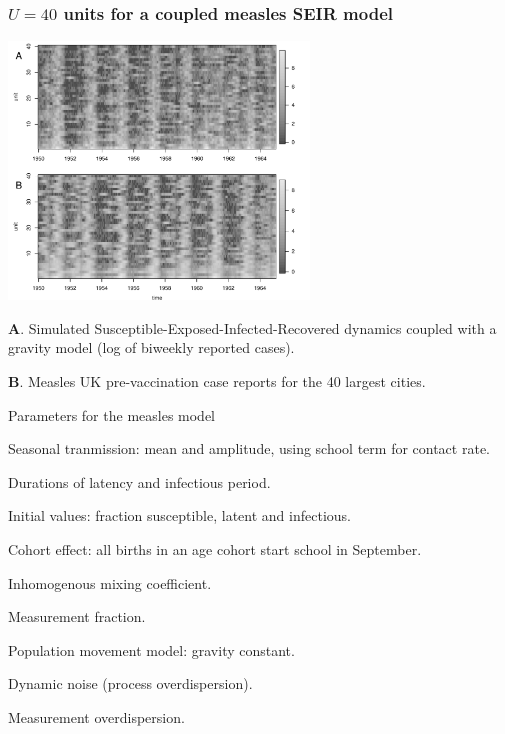 \documentclass{beamer}
\begin{document}
\begin{frame}
\frametitle{$U=40$ units for a coupled measles SEIR model}

\vspace{-2.7mm}

\begin{center}
\includegraphics[width=8cm]{slice_image_plot-1.pdf}
\end{center}

\vspace{-3mm}

{\bf A}. Simulated Susceptible-Exposed-Infected-Recovered dynamics coupled with a gravity model (log of biweekly reported cases).

{\bf B}. Measles UK pre-vaccination case reports for the 40 largest cities.





\end{frame}

\begin{frame}{Parameters for the measles model}
  \bi
\item Seasonal tranmission: mean and amplitude, using school term for contact rate.
  \item Durations of latency and infectious period.
\item Initial values: fraction susceptible, latent and infectious.
\item Cohort effect: all births in an age cohort start school in September.
\item Inhomogenous mixing coefficient.
\item Measurement fraction.
\item Population movement model: gravity constant.
\item Dynamic noise (process overdispersion).
\item Measurement overdispersion.

\ei

  \end{frame}
\end{document}
